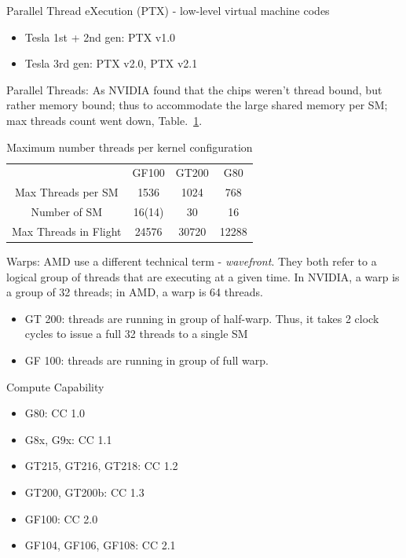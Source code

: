 Parallel Thread eXecution (PTX) - low-level virtual machine codes
\begin{itemize}
\item Tesla 1st + 2nd gen: PTX v1.0
\item Tesla 3rd gen: PTX v2.0, PTX v2.1
\end{itemize}

Parallel Threads: As NVIDIA found that the chips weren't thread
bound, but rather memory bound; thus to accommodate the large shared
memory per SM; max threads count went down,
Table.~\ref{tab:threads_parallel}. 

\begin{table}[hbt]
  \begin{center}
    \caption{Maximum number threads per kernel configuration}
    \begin{tabular}{cccc} 
      \hline
      & GF100 &   GT200 &   G80\\
      Max Threads per SM & 1536 & 1024 & 768\\
      Number of SM & 16(14) & 30 & 16 \\
      Max Threads in Flight &   24576&   30720&   12288\\
      \hline\hline
    \end{tabular}
  \end{center}
  \label{tab:threads_parallel}
\end{table}

Warps: AMD use a different technical term - {\it
  wavefront}.
They both refer to a logical group of threads that are executing at
a given time. In NVIDIA, a warp is a group of 32 threads; in AMD, a
warp is 64 threads. 
\begin{itemize}
\item GT 200: threads are running in group of half-warp. Thus, it
  takes 2 clock cycles to issue a full 32 threads to a single SM
\item GF 100: threads are running in group of full warp.
\end{itemize}

Compute Capability
\begin{itemize}
\item G80: CC 1.0
\item G8x, G9x: CC 1.1
\item GT215, GT216, GT218: CC 1.2
\item GT200, GT200b: CC 1.3
\item GF100: CC 2.0
\item GF104, GF106, GF108: CC 2.1
\end{itemize}

